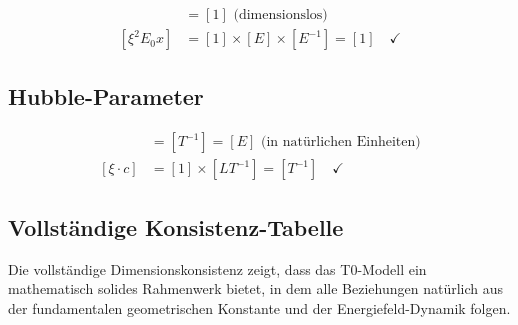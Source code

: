 \documentclass[12pt,a4paper]{article}
\begin{document}
	\begin{align}
		[z] &= [1] \text{ (dimensionslos)} \\
		[\xi^2 E_0 x] &= [1] \times [E] \times [E^{-1}] = [1] \quad \checkmark
	\end{align}
	
	\subsection{Hubble-Parameter}
	
	\begin{align}
		[H_0] &= [T^{-1}] = [E] \text{ (in natürlichen Einheiten)} \\
		[\xi \cdot c] &= [1] \times [LT^{-1}] = [T^{-1}] \quad \checkmark
	\end{align}
	
	\subsection{Vollständige Konsistenz-Tabelle}
	
	\begin{table}[htbp]
		\centering
		\caption{Dimensionskonsistenz-Verifikation}
		\label{tab:dimensional_check}
	\end{table}
	
	Die vollständige Dimensionskonsistenz zeigt, dass das T0-Modell ein mathematisch solides Rahmenwerk bietet, in dem alle Beziehungen natürlich aus der fundamentalen geometrischen Konstante und der Energiefeld-Dynamik folgen.
	
\end{document}
